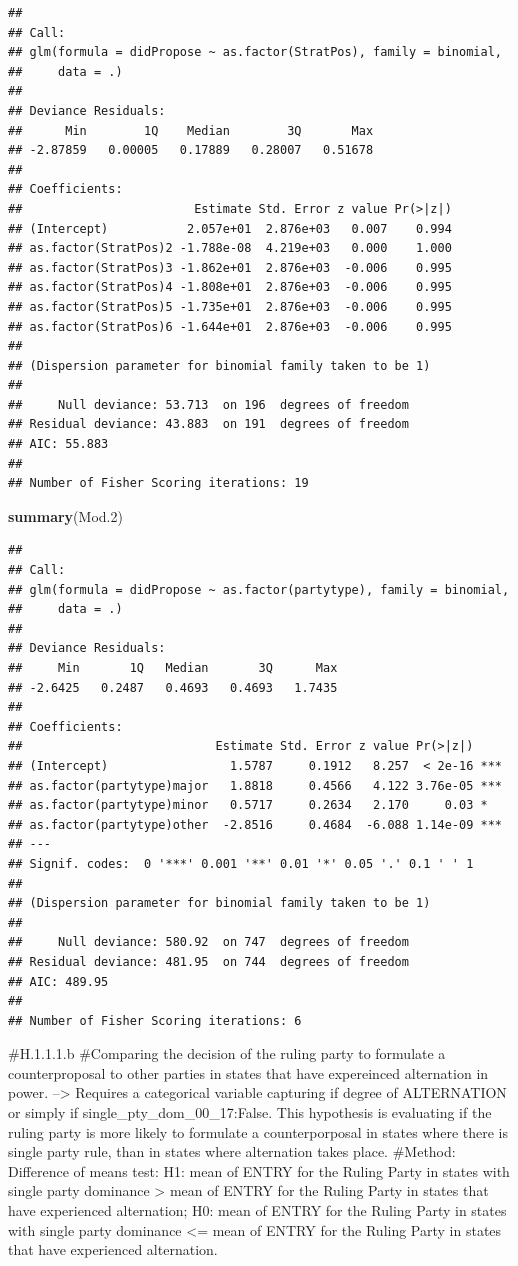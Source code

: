 \documentclass[]{article}
\newenvironment{Shaded}{\begin{snugshade}}{\end{snugshade}}
\newcommand{\FloatTok}[1]{\textcolor[rgb]{0.00,0.00,0.81}{#1}}
\newcommand{\KeywordTok}[1]{\textcolor[rgb]{0.13,0.29,0.53}{\textbf{#1}}}
\newcommand{\NormalTok}[1]{#1}
\begin{document}
\begin{verbatim}
## 
## Call:
## glm(formula = didPropose ~ as.factor(StratPos), family = binomial, 
##     data = .)
## 
## Deviance Residuals: 
##      Min        1Q    Median        3Q       Max  
## -2.87859   0.00005   0.17889   0.28007   0.51678  
## 
## Coefficients:
##                        Estimate Std. Error z value Pr(>|z|)
## (Intercept)           2.057e+01  2.876e+03   0.007    0.994
## as.factor(StratPos)2 -1.788e-08  4.219e+03   0.000    1.000
## as.factor(StratPos)3 -1.862e+01  2.876e+03  -0.006    0.995
## as.factor(StratPos)4 -1.808e+01  2.876e+03  -0.006    0.995
## as.factor(StratPos)5 -1.735e+01  2.876e+03  -0.006    0.995
## as.factor(StratPos)6 -1.644e+01  2.876e+03  -0.006    0.995
## 
## (Dispersion parameter for binomial family taken to be 1)
## 
##     Null deviance: 53.713  on 196  degrees of freedom
## Residual deviance: 43.883  on 191  degrees of freedom
## AIC: 55.883
## 
## Number of Fisher Scoring iterations: 19
\end{verbatim}

\begin{Shaded}
\begin{Highlighting}[]
\KeywordTok{summary}\NormalTok{(Mod}\FloatTok{.2}\NormalTok{)}
\end{Highlighting}
\end{Shaded}

\begin{verbatim}
## 
## Call:
## glm(formula = didPropose ~ as.factor(partytype), family = binomial, 
##     data = .)
## 
## Deviance Residuals: 
##     Min       1Q   Median       3Q      Max  
## -2.6425   0.2487   0.4693   0.4693   1.7435  
## 
## Coefficients:
##                           Estimate Std. Error z value Pr(>|z|)    
## (Intercept)                 1.5787     0.1912   8.257  < 2e-16 ***
## as.factor(partytype)major   1.8818     0.4566   4.122 3.76e-05 ***
## as.factor(partytype)minor   0.5717     0.2634   2.170     0.03 *  
## as.factor(partytype)other  -2.8516     0.4684  -6.088 1.14e-09 ***
## ---
## Signif. codes:  0 '***' 0.001 '**' 0.01 '*' 0.05 '.' 0.1 ' ' 1
## 
## (Dispersion parameter for binomial family taken to be 1)
## 
##     Null deviance: 580.92  on 747  degrees of freedom
## Residual deviance: 481.95  on 744  degrees of freedom
## AIC: 489.95
## 
## Number of Fisher Scoring iterations: 6
\end{verbatim}

\#H.1.1.1.b \#Comparing the decision of the ruling party to formulate a
counterproposal to other parties in states that have expereinced
alternation in power. --\textgreater{} Requires a categorical variable
capturing if degree of ALTERNATION or simply if
single\_pty\_dom\_00\_17:False. This hypothesis is evaluating if the
ruling party is more likely to formulate a counterporposal in states
where there is single party rule, than in states where alternation takes
place. \#Method: Difference of means test: H1: mean of ENTRY for the
Ruling Party in states with single party dominance \textgreater{} mean
of ENTRY for the Ruling Party in states that have experienced
alternation; H0: mean of ENTRY for the Ruling Party in states with
single party dominance \textless{}= mean of ENTRY for the Ruling Party
in states that have experienced alternation.
\end{document}
